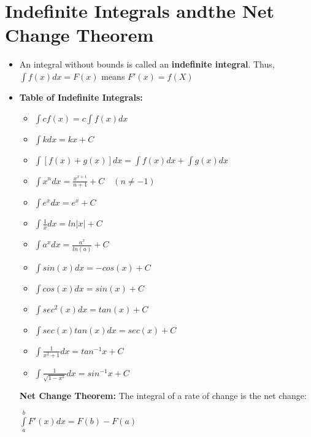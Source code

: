 \documentclass{report}
\begin{document}
		\section{Indefinite Integrals andthe Net Change Theorem}
			\begin{itemize}\addtolength{\leftskip}{2em}
				\item An integral without bounds is called an \textbf{indefinite integral}. Thus, $\int f(x)dx=F(x)$ means $F'(x)=f(X)$
				\item \textbf{Table of Indefinite Integrals:} 
				\begin{itemize}\addtolength{\leftskip}{4em}
				\item $\int cf(x)=c\int f(x)dx$
				\item $\int kdx=kx+C$
				\item $\int [f(x)+g(x)]dx=\int f(x)dx+ \int g(x)dx$
				\item $\int x^n dx=\frac{x^{x+1}}{n+1}+C\quad(n\ne -1)$
				\item $\int e^x dx=e^x+C$
				\item $\int \frac{1}{x}dx=ln|x|+C$
				\item $\int a^xdx=\frac{a^x}{ln(a)}+C$
				\item $\int sin(x)dx=-cos(x)+C$
				\item $\int cos(x)dx=sin(x)+C$
				\item $\int sec^2(x)dx=tan(x)+C$
				\item $\int sec(x)tan(x)dx=sec(x)+C$
				\item $\int \frac{1}{x^2+1}dx=tan^{-1}x+C$
				\item $\int \frac{1}{\sqrt{1-x^2}}dx=sin^{-1}x+C$
				\end{itemize}
				\textbf{Net Change Theorem:} The integral of a rate of change is the net change:
				\begin{center}
				$\int\limits_{a}^{b}F'(x)dx=F(b)-F(a)$
				\end{center}
			\end{itemize}
\end{document}
